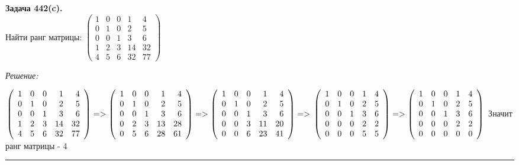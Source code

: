 \documentclass[a4paper, 12pt]{article}
\newenvironment{problem}[2][Задача]
    { \begin{mdframed}[backgroundcolor=gray!10] \textbf{#1 #2.} \\}
    {  \end{mdframed}}
\newenvironment{solution}
    {\textit{Решение: }}
    {\noindent\rule{7in}{1.5pt}}
\begin{document}
\begin{problem}{442(c)}
Найти ранг матрицы:
$\left(\begin{array}{rrrrr}1 & 0 & 0 & 1 & 4\\0 & 1 & 0 & 2 & 5\\ 0 & 0 & 1 & 3 & 6 \\ 1 & 2 & 3 & 14 & 32\\ 4 & 5 & 6 & 32 & 77\end{array}\right)$

\end{problem}
\begin{solution}

$
\left(
  \begin{array}{rrrrr}
    1 & 0 & 0 & 1 & 4 \\
    0 & 1 & 0 & 2 & 5 \\
    0 & 0 & 1 & 3 & 6 \\
    1 & 2 & 3 & 14 & 32 \\
    4 & 5 & 6 & 32 & 77 \\
  \end{array}
\right)
=>
\left(
  \begin{array}{rrrrr}
    1 & 0 & 0 & 1 & 4 \\
    0 & 1 & 0 & 2 & 5 \\
    0 & 0 & 1 & 3 & 6 \\
    0 & 2 & 3 & 13 & 28 \\
    0 & 5 & 6 & 28 & 61 \\
  \end{array}
\right)
=>
\left(
  \begin{array}{rrrrr}
    1 & 0 & 0 & 1 & 4 \\
    0 & 1 & 0 & 2 & 5 \\
    0 & 0 & 1 & 3 & 6 \\
    0 & 0 & 3 & 11 & 20 \\
    0 & 0 & 6 & 23 & 41 \\
  \end{array}
\right)
=> \\
\left(
  \begin{array}{rrrrr}
    1 & 0 & 0 & 1 & 4 \\
    0 & 1 & 0 & 2 & 5 \\
    0 & 0 & 1 & 3 & 6 \\
    0 & 0 & 0 & 2 & 2 \\
    0 & 0 & 0 & 5 & 5 \\
  \end{array}
\right)
=>
\left(
  \begin{array}{rrrrr}
    1 & 0 & 0 & 1 & 4 \\
    0 & 1 & 0 & 2 & 5 \\
    0 & 0 & 1 & 3 & 6 \\
    0 & 0 & 0 & 2 & 2 \\
    0 & 0 & 0 & 0 & 0 \\
  \end{array}
\right)
$
Значит ранг матрицы - 4

\end{solution}

\end{document}
